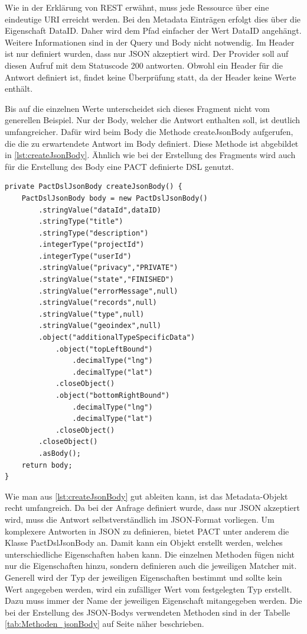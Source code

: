 \documentclass{llncs}
\begin{document}
Wie in der Erklärung von REST erwähnt, muss jede Ressource über eine eindeutige URI erreicht werden. Bei den Metadata Einträgen erfolgt dies über die Eigenschaft DataID. Daher wird dem Pfad einfacher der Wert DataID angehängt. Weitere Informationen sind in der Query und Body nicht notwendig. Im Header ist nur definiert wurden, dass nur JSON akzeptiert wird.
Der Provider soll auf diesen Aufruf mit dem Statuscode 200 antworten. Obwohl ein Header für die Antwort definiert ist, findet keine Überprüfung statt, da der Header keine Werte enthält. 

Bis auf die einzelnen Werte unterscheidet sich dieses Fragment nicht vom generellen Beispiel. Nur der Body, welcher die Antwort enthalten soll, ist deutlich umfangreicher. Dafür wird beim Body die Methode createJsonBody aufgerufen, die die zu erwartendete Antwort im Body definiert. Diese Methode ist abgebildet in \ref{lst:createJsonBody}. Ähnlich wie bei der Erstellung des Fragments wird auch für die Erstellung des Body eine PACT definierte DSL genutzt.

\lstset{language = Java}
\begin{lstlisting}[caption=Test,label={lst:createJsonBody}]
private PactDslJsonBody createJsonBody() {
    PactDslJsonBody body = new PactDslJsonBody()
        .stringValue("dataId",dataID)
        .stringType("title")
        .stringType("description")
        .integerType("projectId")
        .integerType("userId")
        .stringValue("privacy","PRIVATE")
        .stringValue("state","FINISHED")
        .stringValue("errorMessage",null)
        .stringValue("records",null)
        .stringValue("type",null)
        .stringValue("geoindex",null)
        .object("additionalTypeSpecificData")
            .object("topLeftBound")
                .decimalType("lng")
                .decimalType("lat")
            .closeObject()
            .object("bottomRightBound")
                .decimalType("lng")
                .decimalType("lat")
            .closeObject()
        .closeObject()
        .asBody();
    return body;
}
\end{lstlisting}

Wie man aus \ref{lst:createJsonBody} gut ableiten kann, ist das Metadata-Objekt recht umfangreich. Da bei der Anfrage definiert wurde, dass nur JSON akzeptiert wird, muss die Antwort selbstverständlich im JSON-Format vorliegen. Um komplexere Antworten in JSON zu definieren, bietet PACT unter anderem die Klasse PactDslJsonBody an. Damit kann ein Objekt erstellt werden, welches unterschiedliche Eigenschaften haben kann. Die einzelnen Methoden fügen nicht nur die Eigenschaften hinzu, sondern definieren auch die jeweiligen Matcher mit. Generell wird der Typ der jeweiligen Eigenschaften bestimmt und sollte kein Wert angegeben werden, wird ein zufälliger Wert vom festgelegten Typ erstellt. Dazu muss immer der Name der jeweiligen Eigenschaft mitangegeben werden. Die bei der Erstellung des JSON-Bodys verwendeten Methoden sind in der Tabelle \ref{tab:Methoden_jsonBody} auf Seite \pageref{tab:Methoden_jsonBody} näher beschrieben.
\end{document}
